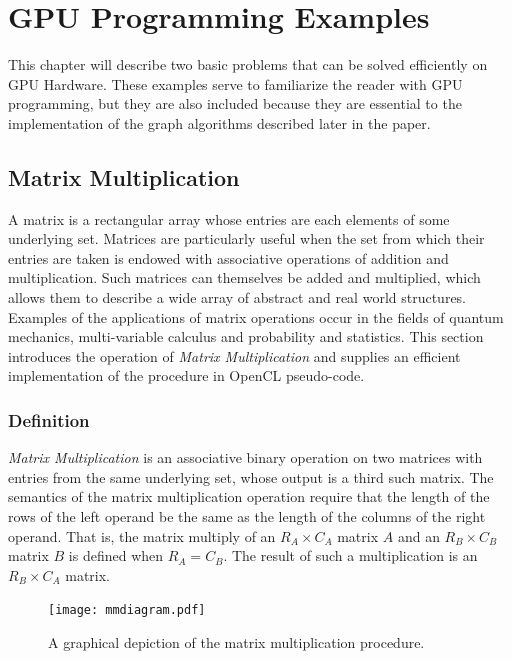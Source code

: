 \documentclass[12pt,twoside]{reedthesis}
\newcommand{\im}[1]{{\em#1}}
\begin{document}
\chapter{GPU Programming Examples}

This chapter will describe two basic problems that can be solved efficiently on GPU Hardware. These examples serve to familiarize the reader with GPU programming, but they are also included because they are essential to the implementation of the graph algorithms described later in the paper.

\section{Matrix Multiplication}
\label{ch:mm}

A matrix is a rectangular array whose entries are each elements of some underlying set. Matrices are particularly useful when the set from which their entries are taken is endowed with associative operations of addition and multiplication. Such matrices can themselves be added and multiplied, which allows them to describe a wide array of abstract and real world structures. Examples of the applications of matrix operations occur in the fields of quantum mechanics, multi-variable calculus and probability and statistics. This section introduces the operation of \im{Matrix Multiplication} and supplies an efficient implementation of the procedure in OpenCL pseudo-code.

\subsection{Definition}

\im{Matrix Multiplication} is an associative binary operation on two matrices with entries from the same underlying set, whose output is a third such matrix. The semantics of the matrix multiplication operation require that the length of the rows of the left operand be the same as the length of the columns of the right operand. That is, the matrix multiply of an $R_A \times C_A$ matrix $A$ and an $R_B \times C_B$ matrix $B$ is defined when $R_A = C_B$. The result of such a multiplication is an $R_B \times C_A$ matrix.

\begin{figure}[h!]
\begin{center}
\texttt{[image: mmdiagram.pdf]}
\end{center}
\caption{A graphical depiction of the matrix multiplication procedure.}
\end{figure}
\label{mmd}
 
\end{document}
